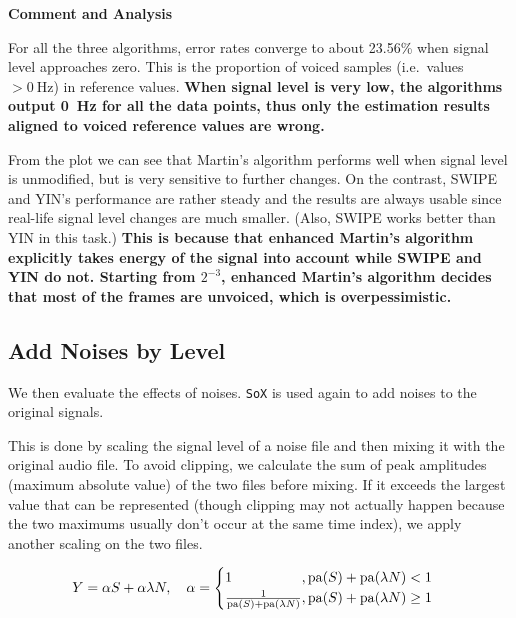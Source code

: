 \documentclass[11pt,a4paper,titlepage]{article}
\begin{document}
\begin{mdframed}
\textbf{Comment and Analysis}

\bigskip

For all the three algorithms, error rates converge to about 23.56\% when signal level approaches zero.
This is the proportion of voiced samples (i.e.\ values \( > \SI{0}{\hertz} \)) in reference values.
\textbf{When signal level is very low, the algorithms output \SI{0}{\hertz} for all the data points, thus only the estimation results aligned to voiced reference values are wrong.}

\bigskip

From the plot we can see that Martin's algorithm performs well when signal level is unmodified, but is very sensitive to further changes.
On the contrast, SWIPE and YIN's performance are rather steady and the results are always usable since real-life signal level changes are much smaller.
(Also, SWIPE works better than YIN in this task.) \textbf{This is because that enhanced Martin's algorithm explicitly takes energy of the signal into account while SWIPE and YIN do not.
Starting from \(2^{-3}\), enhanced Martin's algorithm decides that most of the frames are unvoiced, which is overpessimistic.}
\end{mdframed}

\newpage

\subsection{Add Noises by Level}

We then evaluate the effects of noises.
\texttt{SoX} is used again to add noises to the original signals.

This is done by scaling the signal level of a noise file and then mixing it with the original audio file.
To avoid clipping, we calculate the sum of peak amplitudes (maximum absolute value) of the two files before mixing.
If it exceeds the largest value that can be represented (though clipping may not actually happen because the two maximums usually don't occur at the same time index), we apply another scaling on the two files.

\begin{equation}
  Y = \alpha S + \alpha \lambda N, \quad
  \alpha = \begin{cases}
    \mathrlap{1}\hphantom{\frac{1}{\mathrm{pa}(S) + \mathrm{pa}(\lambda N)}}, \mathrm{pa}(S) + \mathrm{pa}(\lambda N) < 1 \\
    \frac{1}{\mathrm{pa}(S) + \mathrm{pa}(\lambda N)}, \mathrm{pa}(S) + \mathrm{pa}(\lambda N) \geq 1
  \end{cases}
\end{equation}
\end{document}
